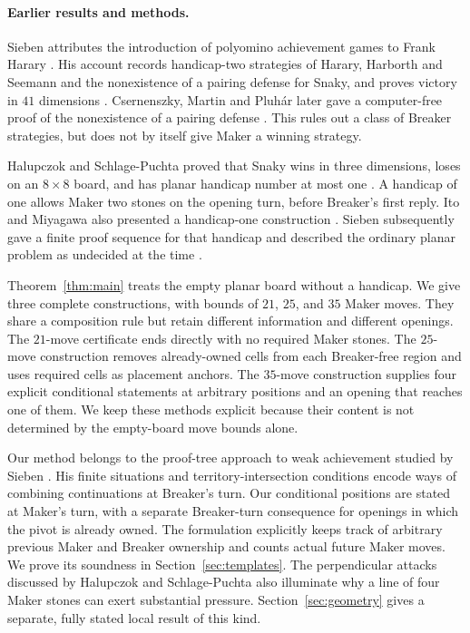 \paragraph{Earlier results and methods.}
Sieben attributes the introduction of polyomino achievement games to
Frank Harary \cite[Section~1]{Sieben2004}. His account records
handicap-two strategies of Harary, Harborth and Seemann and the
nonexistence of a pairing defense for Snaky, and proves victory in
$41$ dimensions \cite[Section~4 and Proposition~4.1]{Sieben2004}.
Csernenszky, Martin and Pluh\'ar later gave a computer-free proof of
the nonexistence of a pairing defense
\cite[Theorem~10]{CsernenszkyMartinPluhar2011}.
This rules out a class of Breaker strategies, but does not by itself
give Maker a winning strategy.

Halupczok and Schlage-Puchta proved that Snaky wins in three
dimensions, loses on an $8\times8$ board, and has planar handicap
number at most one \cite[Theorem~1]{HSP2007}.
A handicap of one allows Maker two stones on the opening turn,
before Breaker's first reply.
Ito and Miyagawa also presented a handicap-one construction
\cite{ItoMiyagawa2007}.
Sieben subsequently gave a finite proof sequence for that handicap
and described the ordinary planar problem as undecided at the time
\cite[Section~1 and Appendix~B]{Sieben2008}.

Theorem~\ref{thm:main} treats the empty planar board without a handicap.
We give three complete constructions, with bounds of $21$, $25$, and
$35$ Maker moves. They share a
composition rule but retain different information and different openings.
The $21$-move certificate ends directly with no required Maker stones.
The $25$-move construction removes already-owned cells from each
Breaker-free region and uses required cells as placement anchors.
The $35$-move construction supplies four explicit conditional statements
at arbitrary positions and an opening that reaches one of them.
We keep these methods explicit because their content is not determined by the empty-board
move bounds alone.

Our method belongs to the proof-tree approach to weak achievement
studied by Sieben \cite[Sections~2--3]{Sieben2008}.
His finite situations and territory-intersection conditions encode
ways of combining continuations at Breaker's turn. Our conditional
positions are stated at Maker's turn, with a separate Breaker-turn
consequence for openings in which the pivot is already owned.
The formulation explicitly keeps track of arbitrary previous Maker
and Breaker ownership and counts actual future Maker moves.
We prove its soundness in Section~\ref{sec:templates}.
The perpendicular attacks discussed by Halupczok and Schlage-Puchta
\cite[Section~3]{HSP2007} also illuminate why a line of four Maker
stones can exert substantial pressure. Section~\ref{sec:geometry}
gives a separate, fully stated local result of this kind.

